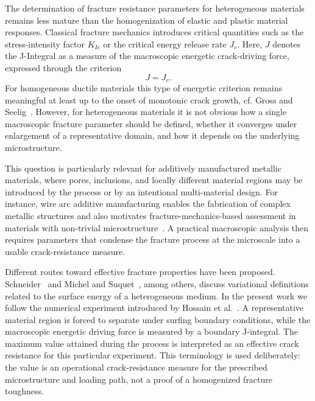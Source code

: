 \documentclass[pamm,a4paper,fleqn]{w-art}
\newcommand{\added}[2][]{#2}
\begin{document}
The determination of fracture resistance parameters for heterogeneous
materials remains less mature than the homogenization of elastic and
plastic material responses. Classical fracture mechanics introduces
critical
quantities such as the stress-intensity factor \(K_{Ic}\) or the
critical energy release rate \(J_c\). \added{Here, \(J\) denotes the
J-Integral as a measure of the macroscopic energetic crack-driving
force,} expressed through the criterion
\begin{equation}
  J = J_c.
  \label{eq:fracture_criterion_J}
\end{equation}
For homogeneous ductile materials this type of energetic criterion
remains meaningful at least up to the onset of monotonic crack
growth, cf. Gross and Seelig~\cite{gross_fracture_2011}. However, for
heterogeneous materials it is not obvious how a single
macroscopic fracture parameter should be defined, whether it
converges under enlargement of a representative domain, and how it
depends on the underlying microstructure.

This question is particularly relevant for additively manufactured
metallic materials, where pores, inclusions, and locally different
material regions may be introduced by the process or by an
intentional multi-material design. For instance,
wire arc additive manufacturing enables the fabrication of complex
metallic structures
and also motivates fracture-mechanics-based assessment in materials
with non-trivial microstructure~\cite{hauser_porosity_2021}. A
practical macroscopic analysis then requires parameters that condense
the fracture process at the microscale into a usable crack-resistance
measure.

Different routes toward effective fracture properties have been
proposed. Schneider~\cite{schneider_fftbased_2020} and Michel and
Suquet~\cite{michel_merits_2022}, among others, discuss variational
definitions related to the surface energy of a heterogeneous medium.
In the present work we follow the numerical experiment introduced by
Hossain et al.~\cite{hossain_effective_2014}. A representative
material region is forced to separate under surfing boundary
conditions, while the macroscopic energetic driving force is measured
by a boundary J-integral. The maximum value attained during the
process is interpreted as an effective crack resistance for this
particular experiment. This terminology is used deliberately: the
value is an operational crack-resistance measure for the prescribed
microstructure and loading path, not a proof of a homogenized
fracture toughness.
\end{document}
